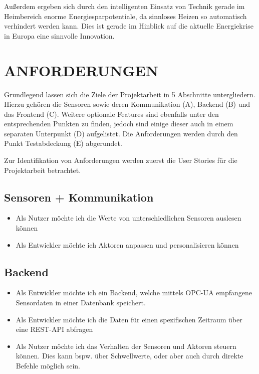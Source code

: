 \documentclass[letterpaper, 10 pt, conference]{ieeeconf}  %
\begin{document}
Außerdem ergeben sich durch den intelligenten Einsatz von Technik gerade im Heimbereich enorme Energiesparpotentiale, da sinnloses Heizen so automatisch verhindert werden kann. 
Dies ist gerade im Hinblick auf die aktuelle Energiekrise in Europa eine sinnvolle Innovation. 




\section{ANFORDERUNGEN}

Grundlegend lassen sich die Ziele der Projektarbeit in 5 Abschnitte untergliedern. Hierzu gehören die Sensoren sowie deren Kommunikation (A), Backend (B) und das Frontend (C). Weitere optionale Features sind ebenfalls unter den entsprechenden Punkten zu finden, jedoch sind einige dieser auch in einem separaten Unterpunkt (D) aufgelistet. Die Anforderungen werden durch den Punkt Testabdeckung (E) abgerundet.

Zur Identifikation von Anforderungen werden zuerst die User Stories für die Projektarbeit betrachtet.


\subsection{Sensoren + Kommunikation} 
\begin{itemize}
    \item Als Nutzer möchte ich die Werte von unterschiedlichen Sensoren auslesen können
    \item Als Entwickler möchte ich Aktoren anpassen und personalisieren können
\end{itemize}

\subsection{Backend}
\begin{itemize}
\item Als Entwickler möchte ich ein Backend, welche mittels OPC-UA empfangene Sensordaten in einer Datenbank speichert. 
\item Als Entwickler möchte ich die Daten für einen spezifischen Zeitraum über eine REST-API abfragen
\item Als Nutzer möchte ich das Verhalten der Sensoren und Aktoren steuern können. Dies kann bspw. über Schwellwerte, oder aber auch durch direkte Befehle möglich sein.
\end{itemize}
\end{document}
